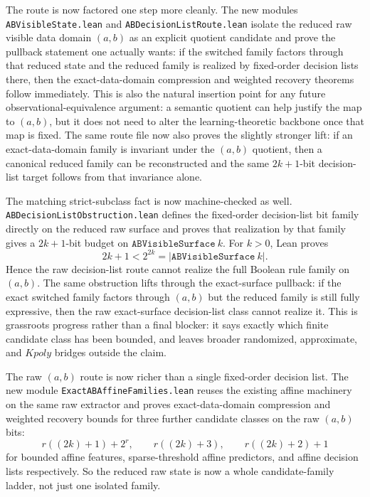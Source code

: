 \documentclass[11pt]{article}
\theoremstyle{remark}
\begin{document}
The route is now factored one step more cleanly.  The new modules
\texttt{ABVisibleState.lean} and \texttt{ABDecisionListRoute.lean} isolate the
reduced raw visible data domain \((a,b)\) as an explicit quotient candidate and
prove the pullback statement one actually wants: if the switched family factors
through that reduced state and the reduced family is realized by fixed-order
decision lists there, then the exact-data-domain compression and weighted recovery
theorems follow immediately.  This is also the natural insertion point for any
future observational-equivalence argument: a semantic quotient can help justify
the map to \((a,b)\), but it does not need to alter the learning-theoretic
backbone once that map is fixed.  The same route file now also proves the
slightly stronger lift: if an exact-data-domain family is invariant under the
\((a,b)\) quotient, then a canonical reduced family can be reconstructed and
the same \(2k+1\)-bit decision-list target follows from that invariance alone.

The matching strict-subclass fact is now machine-checked as well.
\texttt{ABDecisionListObstruction.lean} defines the fixed-order decision-list
bit family directly on the reduced raw surface and proves that realization by
that family gives a \(2k+1\)-bit budget on \(\texttt{ABVisibleSurface}\ k\).
For \(k>0\), Lean proves
\[
  2k+1 < 2^{2k} = |\texttt{ABVisibleSurface}\ k|.
\]
Hence the raw decision-list route cannot realize the full Boolean rule family
on \((a,b)\).  The same obstruction lifts through the exact-surface pullback:
if the exact switched family factors through \((a,b)\) but the reduced family is
still fully expressive, then the raw exact-surface decision-list class cannot
realize it.  This is grassroots progress rather than a final blocker: it says
exactly which finite candidate class has been bounded, and leaves broader
randomized, approximate, and \(Kpoly\) bridges outside the claim.

The raw \((a,b)\) route is now richer than a single fixed-order decision list.
The new module \texttt{ExactABAffineFamilies.lean} reuses the existing affine
machinery on the same raw extractor and proves exact-data-domain compression and
weighted recovery bounds for three further candidate classes on the raw
\((a,b)\) bits:
\[
  r((2k)+1)+2^r, \qquad r((2k)+3), \qquad r((2k)+2)+1
\]
for bounded affine features, sparse-threshold affine predictors, and affine
decision lists respectively.  So the reduced raw state is now a whole
candidate-family ladder, not just one isolated family.
\end{document}
